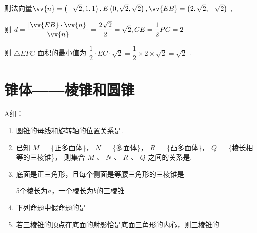 \begin{enumerate}
\begin{jieda}
\begin{enumerate}
            则法向量$\vv{n} = \left( {-\sqrt{2},1,1}\right), E\left( {0,\sqrt{2},\sqrt{2}}\right) ,\vv{EB} = \left( {2,\sqrt{2}, - \sqrt{2}}\right)$ ,
            
            则 $d = \dfrac{\left| \vv{EB} \cdot  \vv{n}\right| }{\left| \vv{n}\right| } = \dfrac{2\sqrt{2}}{2} = \sqrt{2},{CE} = \dfrac{1}{2}{PC} = 2$
            
            则 $\bigtriangleup {EFC}$ 面积的最小值为 $\dfrac{1}{2} \cdot  {EC} \cdot  \sqrt{2} = \dfrac{1}{2} \times  2 \times  \sqrt{2} = \sqrt{2}$ .

        \end{enumerate}
    \end{jieda}
    
\end{enumerate}

\clearpage

\section*{锥体——棱锥和圆锥}
A组：

\begin{enumerate}
    \item 圆锥的母线和旋转轴的位置关系是.
    
    \item 已知 $M =$ \{正多面体\}， $N =$ \{多面体\}， $R =$ \{凸多面体\}， $Q =$ \{棱长相等的三棱锥\}， 则集合 $M\text{ 、 }N\text{ 、 }R\text{ 、 }Q$ 之间的关系是.

    \item 底面是正三角形，且每个侧面是等腰三角形的三棱锥是   
    \begin{jieda}
        5个棱长为$a$，一个棱长为$b$的三棱锥
    \end{jieda}
    
    \item 下列命题中假命题的是   
    
    \item 若三棱锥的顶点在底面的射影恰是底面三角形的内心，则三棱锥的
    
\end{enumerate}

